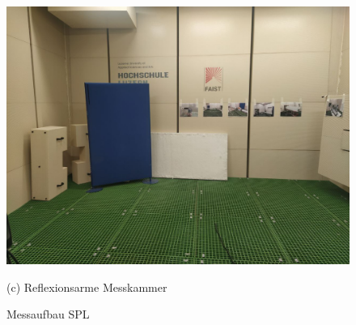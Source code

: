\documentclass[12pt]{article}
\begin{document}
\begin{figure}[H]
\begin{minipage}
				{1\textwidth} \includegraphics[width=\linewidth]{Raum_leer} \caption*{(c) Reflexionsarme Messkammer} 
			\end{minipage} 
			\caption[]{Messaufbau SPL} \label{fig:messaufbau_spl} 
		\end{figure}
		
	\newpage
\end{document}
